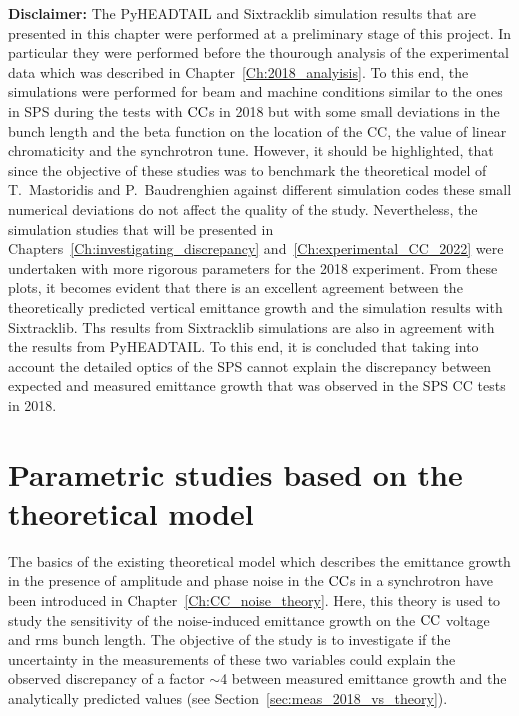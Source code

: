 
\textbf{Disclaimer:} The PyHEADTAIL and Sixtracklib simulation results that are presented in this chapter were performed at a preliminary stage of this project. In  particular they were performed before the thourough analysis of the experimental data which was described in Chapter~\ref{Ch:2018_analyisis}. To this end, the simulations were performed for beam and machine conditions similar to the ones in SPS during the tests with ${\mathrm{CC}}$s in 2018 but with some small deviations in the bunch length and the beta function on the location of the CC, the value of linear chromaticity and the synchrotron tune. However, it should be highlighted, that since the objective of these studies was to benchmark the theoretical model of T.~Mastoridis and P.~Baudrenghien against different simulation codes these small numerical deviations do not affect the quality of the study. Nevertheless, the simulation studies that will be presented in Chapters~\ref{Ch:investigating_discrepancy} and~\ref{Ch:experimental_CC_2022} were undertaken with more rigorous parameters for the 2018 experiment.
From these plots, it becomes evident that there is an excellent agreement between the theoretically predicted vertical emittance growth and the simulation results with Sixtracklib. Ths results from Sixtracklib simulations are also in agreement with the results from PyHEADTAIL. To this end, it is concluded that taking into account the detailed optics of the SPS cannot explain the discrepancy between expected and measured emittance growth that was observed in the SPS CC tests in 2018.

\section{Parametric studies based on the theoretical model}\label{sec:paramteric_studies_theory}

The basics of the existing theoretical model which describes the emittance growth in the presence of amplitude and phase noise in the ${\mathrm{CC}}$s in a synchrotron have been introduced in Chapter~\ref{Ch:CC_noise_theory}. Here, this theory is used to study the sensitivity of the noise-induced emittance growth on the ${\mathrm{CC}}$ voltage and rms bunch length. The objective of the study is to investigate if the uncertainty in the measurements of these two variables could explain the observed discrepancy of a factor $\sim$4 between measured emittance growth and the analytically predicted values (see Section~\ref{sec:meas_2018_vs_theory}).

